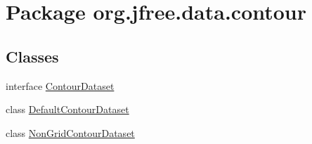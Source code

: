 \hypertarget{namespaceorg_1_1jfree_1_1data_1_1contour}{}\section{Package org.\+jfree.\+data.\+contour}
\label{namespaceorg_1_1jfree_1_1data_1_1contour}
\subsection*{Classes}
\begin{DoxyCompactItemize}
\item 
interface \mbox{\hyperlink{interfaceorg_1_1jfree_1_1data_1_1contour_1_1_contour_dataset}{Contour\+Dataset}}
\item 
class \mbox{\hyperlink{classorg_1_1jfree_1_1data_1_1contour_1_1_default_contour_dataset}{Default\+Contour\+Dataset}}
\item 
class \mbox{\hyperlink{classorg_1_1jfree_1_1data_1_1contour_1_1_non_grid_contour_dataset}{Non\+Grid\+Contour\+Dataset}}
\end{DoxyCompactItemize}
